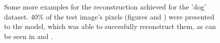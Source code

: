 \documentclass{article} %
\begin{document}
\begin{figure}[ht]
\begin{center}
\end{center}
\caption{\small{
Some more examples for the reconstruction achieved for the 'dog' dataset. $40\%$ of the test image's pixels (figures  and ) were presented  to the model, which was able to succesfully reconstruct them, as can be seen in  and .
}
}
\label{fig:supplDog}
\end{figure}
\end{document}
